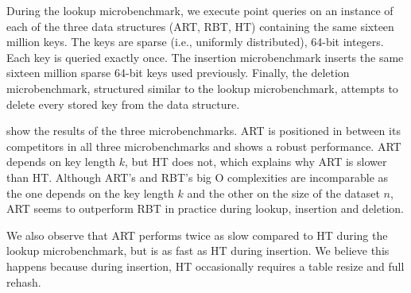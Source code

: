 \documentclass[abstracton,12pt]{scrartcl}
\theoremstyle{definition}
\begin{document}
During the lookup microbenchmark, we execute point queries on an instance
of each of the three data structures (ART, RBT, HT)
containing the same sixteen million keys. The keys are sparse (i.e., uniformly
distributed), 64-bit integers. Each key is queried exactly once.
The insertion microbenchmark inserts the same sixteen million sparse 64-bit keys
used previously. Finally, the deletion microbenchmark, structured similar to 
the lookup microbenchmark, attempts to delete every stored key from the data 
structure.

show the results of the three microbenchmarks. ART is positioned in between 
its competitors in all three microbenchmarks and shows a robust performance.
ART depends on key length $k$, but HT does not, which explains why ART is
slower than HT. Although ART's and RBT's big O complexities are incomparable
as the one depends on the key length $k$ and the other on the size of the 
dataset $n$, ART seems to outperform RBT in practice during lookup, insertion
and deletion.

We also observe that ART performs twice as slow compared to HT during the 
lookup microbenchmark, but is as fast as HT during insertion.
We believe this happens because during insertion, HT occasionally 
requires a table resize and full rehash.
\end{document}
